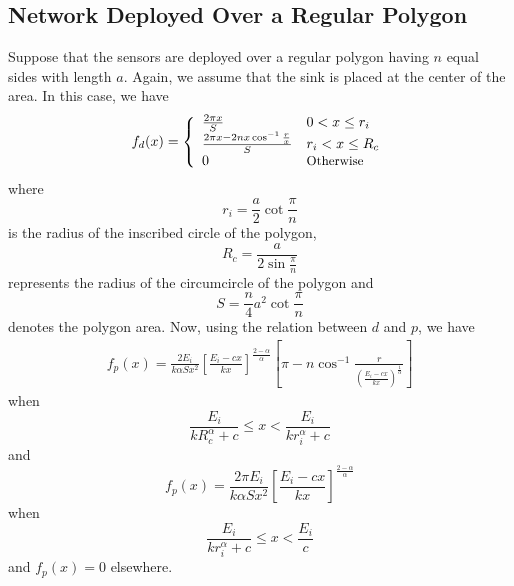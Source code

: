 \documentclass[conference]{IEEEtran}
\begin{document}
\subsection{Network Deployed Over a Regular Polygon}
Suppose that the sensors are deployed over a regular polygon having
$n$ equal sides with length $a$. Again, we assume that the sink is
placed at the center of the area. In this case, we have
\begin{equation}
f_d(x) = \left\{
\begin{array}{ll}
\frac{2\pi x}{S} & 0 < x \leq r_i \\
\frac{2\pi x - 2 n x \cos^{-1}{\frac{r}{x}}}{S} & r_i < x \leq R_c\\
0 & \text{\small{Otherwise}}
\end{array} \right.
\end{equation}
where
\begin{equation}
r_i = \frac{a}{2} \cot{\frac{\pi}{n}}
\end{equation}
is the radius of the inscribed circle of the polygon,
\begin{equation}
R_c = \frac{a}{2 \sin{\frac{\pi}{n}}}
\end{equation}
represents the radius of the circumcircle of the polygon and
\begin{equation}
S = \frac{n}{4} a^2 \cot{\frac{\pi}{n}}
\end{equation}
denotes the polygon area. Now, using the relation between $d$ and
$p$, we have
\begin{align}
f_p(x) = \frac{2 E_i}{k \alpha S x^2} \left[
\frac{E_i-cx}{kx}\right]^{\frac{2-\alpha}{\alpha}} \left[\pi - n
\cos^{-1}{\frac{r}{\left (\frac{E_i -
cx}{kx}\right)^{\frac{1}{\alpha}}}} \right]
\end{align}
when
\begin{equation}
\frac{E_i}{kR_c^{\alpha} + c}\leq x < \frac{E_i}{kr_i^{\alpha} + c}
\nonumber
\end{equation}
and
\begin{equation}
f_p(x) = \frac{2 \pi E_i}{k \alpha S x^2}
\left[\frac{E_i-cx}{kx}\right]^{\frac{2-\alpha}{\alpha}}
\end{equation}
when
\begin{equation}
\frac{E_i}{kr_i^{\alpha} + c}\leq x < \frac{E_i}{c} \nonumber
\end{equation}
and $f_p(x) = 0$ elsewhere.
\end{document}
